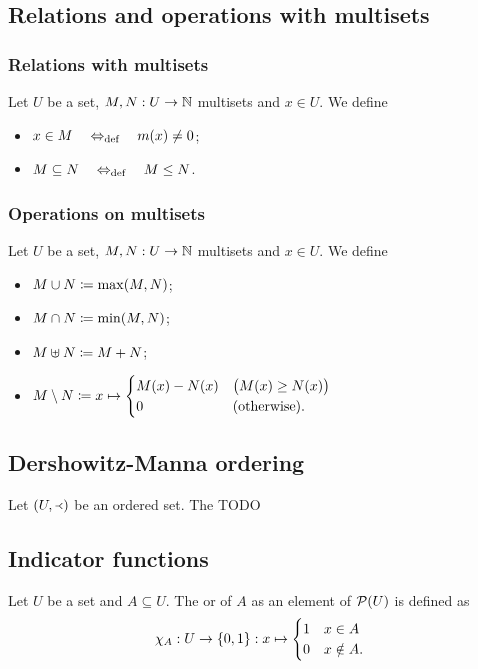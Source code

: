 \subsection{Relations and operations with multisets}
\subsubsection{Relations with multisets}
\begin{definition}
Let $U$ be a set, $M,N: U\to \mathbb{N}$ multisets and $x\in U$. We define
\begin{itemize}
\item $x\in M \quad\Leftrightarrow_{\text{def}}\quad m(x) \neq 0$;
\item $M\subseteq N \quad\Leftrightarrow_{\text{def}}\quad M \leq N$.
\end{itemize}
\end{definition}

\subsubsection{Operations on multisets}
\begin{definition}
Let $U$ be a set, $M,N: U\to \mathbb{N}$ multisets and $x\in U$. We define
\begin{itemize}
\item $M\cup N \coloneqq \max(M,N)$;
\item $M\cap N \coloneqq \min(M,N)$;
\item $M\uplus N \coloneqq M+N$;
\item $M\setminus N \coloneqq x\mapsto\begin{cases}
M(x) - N(x) & \big(M(x) \geq N(x)\big) \\
0 & (\text{otherwise}).
\end{cases}$
\end{itemize}
\end{definition}

\subsection{Dershowitz-Manna ordering}
\begin{definition}
Let $\sSet{U,\Yleft}$ be an ordered set. The TODO
\end{definition}

\subsection{Indicator functions}
\begin{definition}
Let $U$ be a set and $A\subseteq U$. The  or  of $A$ as an element of $\operatorname{\mathcal{P}}(U)$ is defined as
\[ \chi_{A}: U\to \{0,1\}: x\mapsto \begin{cases}
1 & x\in A \\ 0 & x\notin A.
\end{cases} \]
\end{definition}

